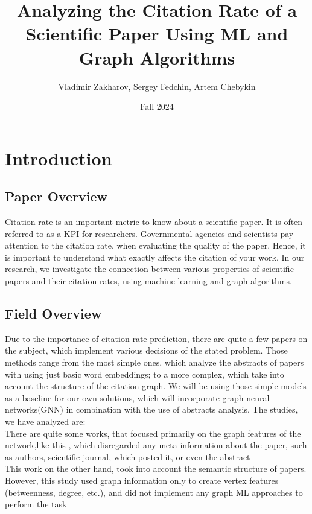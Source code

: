 \documentclass{article}
\title{Analyzing the Citation Rate of a Scientific Paper Using ML and Graph Algorithms}
\author{Vladimir Zakharov, Sergey Fedchin, Artem Chebykin}
\date{Fall 2024}
\newcommand\tab[1][1cm]{\hspace*{#1}}
\begin{document}
\maketitle

\tableofcontents

\newpage
\section{Introduction}

\subsection{Paper Overview}

\tab Citation rate is an important metric to know about a scientific paper. It is often referred to as a KPI for researchers. Governmental agencies and scientists pay attention to the citation rate, when evaluating the quality of the paper. Hence, it is important to understand what exactly affects the citation of your work. In our research, we investigate the connection between various properties of scientific papers and their citation rates, using machine learning and graph algorithms. \\

\subsection{Field Overview}
\tab Due to the importance of citation rate prediction, there are quite a few papers on the subject, which implement various decisions of the stated problem. Those methods range from the most simple ones, which analyze the abstracts of papers with using just basic word embeddings; to a more complex, which take into account the structure of the citation graph. We will be using those simple models as a baseline for our own solutions, which will incorporate graph neural networks(GNN) in combination with the use of abstracts analysis. The studies, we have analyzed are: \\

\tab There are quite some works, that focused primarily on the graph features of the network,like this \cite{1}, which disregarded any meta-information about the paper, such as authors, scientific journal, which posted it, or even the abstract\\

This work \cite{2} on the other hand, took into account the semantic structure of papers. However, this study used graph information only to create vertex features (betweenness, degree, etc.), and did not implement any graph ML approaches to perform the task\\
\end{document}
